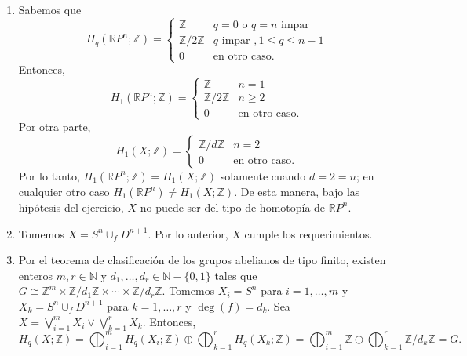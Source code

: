 \documentclass[11pt,a4paper]{article}
\theoremstyle{plain}
\theoremstyle{definition}
\theoremstyle{remark}
\newcommand{\RR}{\mathbb R}
\newcommand{\NN}{\mathbb N}
\newcommand{\ZZ}{\mathbb Z}
\begin{document}
\begin{enumerate}[label=\arabic*.,leftmargin=*]
\begin{enumerate}[label=\alph*)]
En resumen,
\[
H_q(X;\ZZ)=\begin{cases}\ZZ & q=0\\ \ZZ/d\ZZ & q=n-1\\0 & \text{en otro caso.}\end{cases}
\]
\item Sabemos que
\[
H_q(\RR P^n;\ZZ)=\begin{cases}\ZZ & q=0\text{ o }q=n\text{ impar}\\ \ZZ/2\ZZ & q\text{ impar },1\le q\le n-1\\0 & \text{en otro caso.}\end{cases}
\]
Entonces,
\[
H_1(\RR P^n;\ZZ)=\begin{cases}\ZZ & n=1\\ \ZZ/2\ZZ & n\ge2\\0 & \text{en otro caso.}\end{cases}
\]
Por otra parte,
\[
H_1(X;\ZZ)=\begin{cases}\ZZ/d\ZZ & n=2\\0 & \text{en otro caso.}\end{cases}
\]
Por lo tanto, $H_1(\RR P^n;\ZZ)=H_1(X;\ZZ)$ solamente cuando $d=2=n$; en
cualquier otro caso $H_1(\RR P^n)\ne H_1(X;\ZZ)$. De esta manera, bajo las
hipótesis del ejercicio, $X$ no puede ser del tipo de homotopía de
$\RR P^n$.
\item Tomemos $X=S^n\cup_fD^{n+1}$. Por lo anterior, $X$ cumple los
requerimientos.
\item Por el teorema de clasificación de los grupos abelianos de tipo
finito, existen enteros $m,r\in\NN$ y $d_1,\dots,d_r\in\NN-\{0,1\}$ tales
que $G\cong\ZZ^m\times\ZZ/d_1\ZZ\times\cdots\times\ZZ/d_r\ZZ$. Tomemos
$X_i=S^n$ para $i=1,\dots,m$ y $X_k=S^n\cup_fD^{n+1}$ para $k=1,\dots,r$ y
$\deg(f)=d_k$. Sea $X=\bigvee_{i=1}^mX_i\vee\bigvee_{k=1}^rX_k$. Entonces,
\[
H_q(X;\ZZ)=\bigoplus_{i=1}^mH_q(X_i;\ZZ)\oplus\bigoplus_{k=1}^rH_q(X_k;\ZZ)
=\bigoplus_{i=1}^m\ZZ\oplus\bigoplus_{k=1}^r\ZZ/d_k\ZZ
=G.
\]
\end{enumerate}


\end{enumerate}
\end{document}
